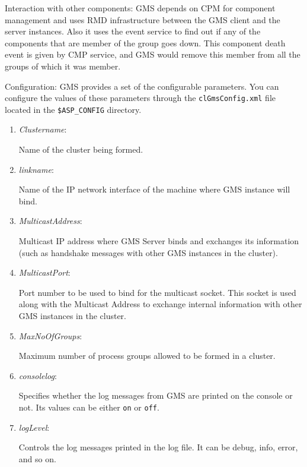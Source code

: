 \begin{flushleft}
\begin{Desc}
\item[Interaction with other components:]
GMS depends on CPM for component management and uses RMD
infrastructure between the GMS client and the server instances. Also
it uses the event service to find out if any of the components that
are member of the group goes down. This component death event is
given by CMP service, and GMS would remove this member from all the
groups of which it was member.
\end{Desc}

\begin{Desc}
\item[Configuration:]
GMS provides a set of the configurable parameters. You can configure
the values of these parameters through the {\tt{clGmsConfig.xml}}  file
located in the {\tt{\$ASP\_\-CONFIG}} directory.
\begin{enumerate}
\item \begin{bf}\textit{Clustername}: \end{bf} Name of the cluster being formed.
\item \begin{bf}\textit{linkname}: \end{bf} Name of the IP network interface of the machine where GMS instance will bind.
\item \begin{bf}\textit{MulticastAddress}: \end{bf} Multicast IP address where GMS Server binds and exchanges its information (such as handshake messages 
with other GMS instances in the cluster).
\item \begin{bf}\textit{MulticastPort}: \end{bf} Port number to be used to bind for the multicast socket. This socket is used along with the Multicast
 Address to exchange internal information with other GMS instances in the cluster.
\item \begin{bf}\textit{MaxNoOfGroups}: \end{bf} Maximum number of process groups allowed to be formed in a cluster.
\item \begin{bf}\textit{consolelog}: \end{bf} Specifies whether the log messages from GMS are printed on the console or not. Its values can be either 
{\tt{on}} or {\tt{off}}.
\item \begin{bf}\textit{logLevel}: \end{bf} Controls the log messages printed in the log file. It can be debug, info, error, and so on.
\end{enumerate}
\end{Desc}



\end{flushleft}
